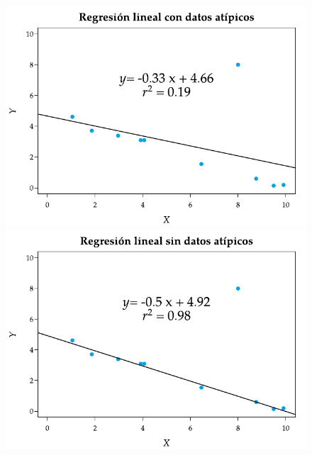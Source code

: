 \documentclass[
  a4paper,
]{scrreport}
\theoremstyle{plain}
\theoremstyle{definition}
\theoremstyle{definition}
\theoremstyle{remark}
\begin{document}
\begin{figure}

\begin{minipage}{0.50\linewidth}

\includegraphics{img/regresion/regresion_lineal_con_datos_atipicos.pdf}

\end{minipage}%
%
\begin{minipage}{0.50\linewidth}

\includegraphics{img/regresion/regresion_lineal_sin_datos_atipicos.pdf}

\end{minipage}%

\end{figure}%
\end{document}
